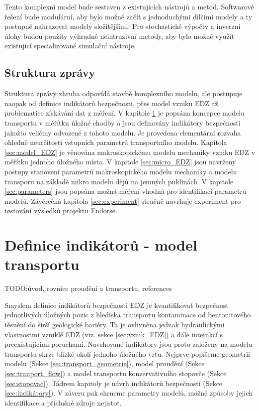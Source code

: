 \documentclass{article}
\def\todo#1{{TODO:\color{violet}#1}}
\begin{document}
Tento komplexní model bude sestaven z existujících nástrojů a metod. Softwarové řešení bude modulární, aby bylo možné začít s
jednoduchými dílčími modely a ty postupně nahrazovat modely složitějšími. Pro stochastické výpočty a inverzní úlohy budou 
použity výhradně neintruzivní metody, aby bylo možné využít existující specializované simulační nástroje.

    
\subsection{Struktura zprávy}
Struktura zprávy zhruba odpovídá stavbě komplexního modelu, ale postupuje naopak od definice indikátorů bezpečnosti,
přes model vzniku EDZ až problematice získávání dat z měření. 
V kapitole \ref{sec:transport} je popsána koncepce modelu transportu v měřítku úložné chodby a 
jsou definovány indikátory bezpečnosti jakožto veličiny odvozené z tohoto modelu. Je provedena elementární rozvaha ohledně 
neurčitosti vstupních parametrů transportního modelu. Kapitola
\ref{sec:model_EDZ} je věnována makroskopickému modelu mechaniky vzniku EDZ v měřítku jednoho úložného místa. 
V kapitole \ref{sec:micro_EDZ} jsou navrženy postupy stanovení parametrů makroskopického modelu mechaniky a modelu transporu 
na základě mikro modelu dějů na jemných puklinách.
V kapitole \ref{sec:parameters} jsou popsána možná měření vhodná pro identifikaci 
parametrů modelů. Závěrečná kapitola \ref{sec:experiment} stručně navrhuje experiment pro testování výsledků projektu Endorse.


\section{Definice indikátorů - model transportu}
\label{sec:transport}
\todo{úvod, rovnice proudění a transportu, references}

Smyslem definice indikátorů bezpečnosti EDZ je kvantifikovat bezpečnost jednotlivých úložných pozic z hlediska 
transportu kontaminace od bentonitového těsnění do širší geologické bariéry. Ta je ovlivněna jednak hydraulickými vlastnostmi
vzniklé EDZ (viz. sekce \ref{sec:vznik_EDZ}) a dále interakcí s preexistujícími poruchami. 
Navrhované indikátory jsou proto založeny na modelu transportu skrze blízké okolí jednoho úložného vrtu. 
Nejprve popíšeme geometrii modelu (Sekce  \ref{sec:transport_geometrie}), model proudění (Sekce \ref{sec:tranport_flow})
a model transportu konzervativního stopovče (Sekce \ref{sec:stopovac}). Jádrem kapitoly je návrh indikátorů bezpečnosti (Sekce \ref{sec:indikátory}). 
V záveru pak shrneme parametry modelů, možné způsoby jejich identifikace a příslušné zdroje nejistot.
\end{document}
